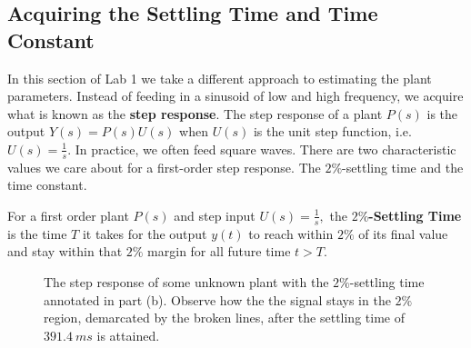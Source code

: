 \subsection{Acquiring the Settling Time and Time Constant}
In this section of Lab 1 we take a different approach to estimating the plant
parameters. Instead of feeding in a sinusoid of low and high frequency, we
acquire what is known as the \textbf{step response}. The step response of
a plant \(P(s)\) is the output \(Y(s) = P(s) U(s)\) when \(U(s)\) is the unit
step function, i.e. \(U(s) = \frac{1}{s}.\) In practice, we often feed
square waves.
%
There are two characteristic values we care about for a first-order step
response. The \(2\%\)-settling time and the time constant.
\begin{definition}
  For a first order plant \(P(s)\) and step input \(U(s) = \frac{1}{s},\)
  the \textbf{\(2\%\)-Settling Time} is the time \(T\) it takes for
  the output \(y(t)\) to reach within \(2\%\) of its final value and stay
  within that \(2\%\) margin for all future time \(t > T.\)
\end{definition}
%
\begin{figure}
  \centering
  \hfill
  \caption{
    The step response of some unknown plant with the \(2\%\)-settling time
    annotated in part (b). Observe how the the signal stays in
    the \(2\%\) region, demarcated by the broken lines,
    after the settling time of \(\SI{391.4}{ms}\) is attained.
  }
  \label{fig:lab1:settling-time}
\end{figure}
